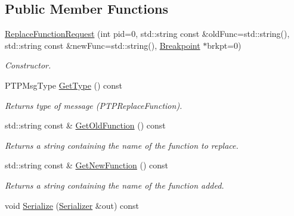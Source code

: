 \subsection*{Public Member Functions}
\begin{DoxyCompactItemize}
\item 
\hyperlink{class_common_1_1_replace_function_request_a10fc14a5a61d9497d972a2ec57b02ebe}{Replace\-Function\-Request} (int pid=0, std\-::string const \&old\-Func=std\-::string(), std\-::string const \&new\-Func=std\-::string(), \hyperlink{class_common_1_1_breakpoint}{Breakpoint} $\ast$brkpt=0)
\begin{DoxyCompactList}\small\item\em Constructor. \end{DoxyCompactList}\item 
\hypertarget{class_common_1_1_replace_function_request_a7bb3f7efba25a1566efe4ccc3054cd63}{P\-T\-P\-Msg\-Type \hyperlink{class_common_1_1_replace_function_request_a7bb3f7efba25a1566efe4ccc3054cd63}{Get\-Type} () const }\label{class_common_1_1_replace_function_request_a7bb3f7efba25a1566efe4ccc3054cd63}

\begin{DoxyCompactList}\small\item\em Returns type of message (P\-T\-P\-Replace\-Function). \end{DoxyCompactList}\item 
\hypertarget{class_common_1_1_replace_function_request_a86dc0fe0546f0b4d331116f68f8c45f0}{std\-::string const \& \hyperlink{class_common_1_1_replace_function_request_a86dc0fe0546f0b4d331116f68f8c45f0}{Get\-Old\-Function} () const }\label{class_common_1_1_replace_function_request_a86dc0fe0546f0b4d331116f68f8c45f0}

\begin{DoxyCompactList}\small\item\em Returns a string containing the name of the function to replace. \end{DoxyCompactList}\item 
\hypertarget{class_common_1_1_replace_function_request_a0285b26773d41dc9b2b6289ce104102c}{std\-::string const \& \hyperlink{class_common_1_1_replace_function_request_a0285b26773d41dc9b2b6289ce104102c}{Get\-New\-Function} () const }\label{class_common_1_1_replace_function_request_a0285b26773d41dc9b2b6289ce104102c}

\begin{DoxyCompactList}\small\item\em Returns a string containing the name of the function added. \end{DoxyCompactList}\item 
\hypertarget{class_common_1_1_replace_function_request_a1ba53378e26e28ff1052285492c50fd4}{void \hyperlink{class_common_1_1_replace_function_request_a1ba53378e26e28ff1052285492c50fd4}{Serialize} (\hyperlink{class_common_1_1_serializer}{Serializer} \&out) const }\label{class_common_1_1_replace_function_request_a1ba53378e26e28ff1052285492c50fd4}


\end{DoxyCompactItemize}
